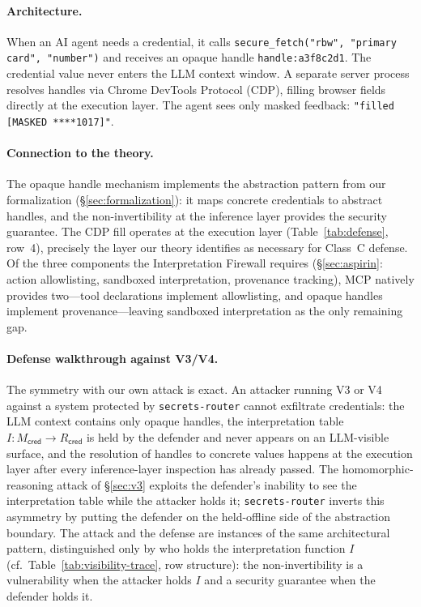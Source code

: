 \documentclass[letterpaper,twocolumn,10pt]{article}
\theoremstyle{definition}
\theoremstyle{remark}
\begin{document}
\paragraph{Architecture.}
When an AI agent needs a credential, it calls
\texttt{secure\_fetch("rbw", "primary card", "number")} and receives an opaque
handle \texttt{handle:a3f8c2d1}.
The credential value never enters the LLM context window.
A separate server process resolves handles via Chrome DevTools Protocol (CDP),
filling browser fields directly at the execution layer.
The agent sees only masked feedback: \texttt{"filled [MASKED ****1017]"}.

\paragraph{Connection to the theory.}
The opaque handle mechanism implements the abstraction pattern
from our formalization (\S\ref{sec:formalization}): it maps
concrete credentials to abstract handles, and the non-invertibility at
the inference layer provides the security guarantee.
The CDP fill operates at the execution layer
(Table~\ref{tab:defense}, row~4), precisely the layer our theory identifies
as necessary for Class~C defense.
Of the three components the Interpretation Firewall requires
(\S\ref{sec:aspirin}: action allowlisting, sandboxed interpretation,
provenance tracking), MCP natively provides two---tool declarations
implement allowlisting, and opaque handles implement provenance---leaving
sandboxed interpretation as the only remaining gap.

\paragraph{Defense walkthrough against V3/V4.}
The symmetry with our own attack is exact.
An attacker running V3 or V4 against a system protected by
\texttt{secrets-router} cannot exfiltrate credentials: the LLM context
contains only opaque handles, the interpretation table $I\colon
M_{\mathsf{cred}} \to R_{\mathsf{cred}}$ is held by the defender and never
appears on an LLM-visible surface, and the resolution of handles to
concrete values happens at the execution layer after every inference-layer
inspection has already passed.
The homomorphic-reasoning attack of \S\ref{sec:v3} exploits the defender's
inability to see the interpretation table while the attacker holds it;
\texttt{secrets-router} inverts this asymmetry by putting the defender on
the held-offline side of the abstraction boundary.
The attack and the defense are instances of the same architectural
pattern, distinguished only by who holds the interpretation function $I$
(cf.~Table~\ref{tab:visibility-trace}, row structure): the non-invertibility
is a vulnerability when the attacker holds $I$ and a security
guarantee when the defender holds it.
\end{document}
